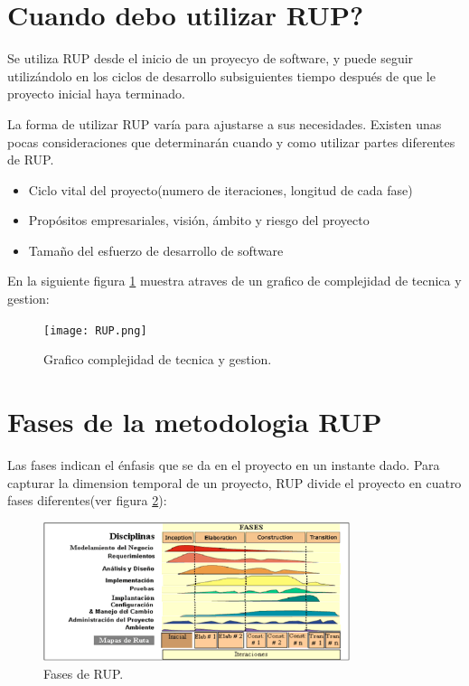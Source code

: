 \documentclass[spanish]{udpreport}
\begin{document}
\section{Cuando debo utilizar RUP?}
\label{sec: Cuando debo utilizar RUP}
Se utiliza RUP desde el inicio de  un proyecyo de software, y puede seguir utilizándolo en los ciclos de desarrollo subsiguientes tiempo después de que le proyecto inicial haya terminado. \par
La forma de utilizar RUP varía para ajustarse a sus necesidades. Existen unas pocas consideraciones que determinarán cuando y como utilizar partes diferentes de RUP.
\begin{itemize}
\item Ciclo vital del proyecto(numero de iteraciones, longitud de cada fase)
\item Propósitos empresariales, visión, ámbito y riesgo del proyecto
\item Tamaño del esfuerzo de desarrollo de software
\end{itemize}
En la siguiente figura \ref{fig:grafico} muestra atraves de un grafico de complejidad de tecnica y gestion:

\begin{figure}[h]
	\centering
	\texttt{[image: RUP.png]}
	\caption{\label{fig:grafico}Grafico complejidad de tecnica y gestion.}
\end{figure}

\section{Fases de la metodologia RUP}
Las fases indican el énfasis que se da en el proyecto en un instante dado. Para capturar la dimension temporal de un proyecto, RUP divide el proyecto en cuatro fases diferentes(ver figura \ref{fig:fases}):

\begin{figure}[!h]
	\centering
	\includegraphics[width=0.8\textwidth]{fases.png}
	\caption{\label{fig:fases}Fases de RUP.}
\end{figure}
\end{document}
